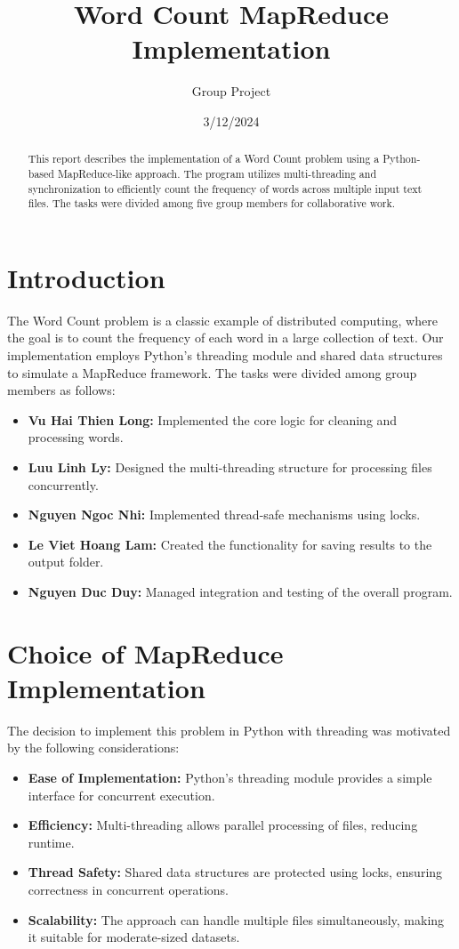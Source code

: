 \documentclass[12pt]{article}
\title{Word Count MapReduce Implementation}
\author{Group Project}
\date{3/12/2024}
\begin{document}
\maketitle

\begin{abstract}
This report describes the implementation of a Word Count problem using a Python-based MapReduce-like approach. The program utilizes multi-threading and synchronization to efficiently count the frequency of words across multiple input text files. The tasks were divided among five group members for collaborative work.
\end{abstract}

\section{Introduction}
The Word Count problem is a classic example of distributed computing, where the goal is to count the frequency of each word in a large collection of text. Our implementation employs Python's threading module and shared data structures to simulate a MapReduce framework. The tasks were divided among group members as follows:
\begin{itemize}
    \item \textbf{Vu Hai Thien Long:} Implemented the core logic for cleaning and processing words.
    \item \textbf{Luu Linh Ly:} Designed the multi-threading structure for processing files concurrently.
    \item \textbf{Nguyen Ngoc Nhi:} Implemented thread-safe mechanisms using locks.
    \item \textbf{Le Viet Hoang Lam:} Created the functionality for saving results to the output folder.
    \item \textbf{Nguyen Duc Duy:} Managed integration and testing of the overall program.
\end{itemize}

\section{Choice of MapReduce Implementation}
The decision to implement this problem in Python with threading was motivated by the following considerations:
\begin{itemize}
    \item \textbf{Ease of Implementation:} Python's threading module provides a simple interface for concurrent execution.
    \item \textbf{Efficiency:} Multi-threading allows parallel processing of files, reducing runtime.
    \item \textbf{Thread Safety:} Shared data structures are protected using locks, ensuring correctness in concurrent operations.
    \item \textbf{Scalability:} The approach can handle multiple files simultaneously, making it suitable for moderate-sized datasets.
\end{itemize}
\end{document}
